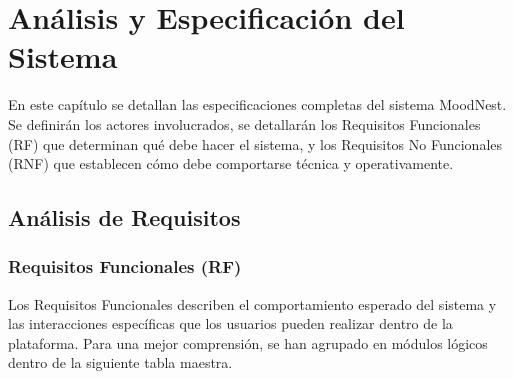 
\section{Análisis y Especificación del Sistema}

En este capítulo se detallan las especificaciones completas del sistema MoodNest. Se definirán los actores involucrados, se detallarán los Requisitos Funcionales (RF) que determinan qué debe hacer el sistema, y los Requisitos No Funcionales (RNF) que establecen cómo debe comportarse técnica y operativamente.

\subsection{Análisis de Requisitos}

\subsubsection{Requisitos Funcionales (RF)}

Los Requisitos Funcionales describen el comportamiento esperado del sistema y las interacciones específicas que los usuarios pueden realizar dentro de la plataforma. Para una mejor comprensión, se han agrupado en módulos lógicos dentro de la siguiente tabla maestra.

